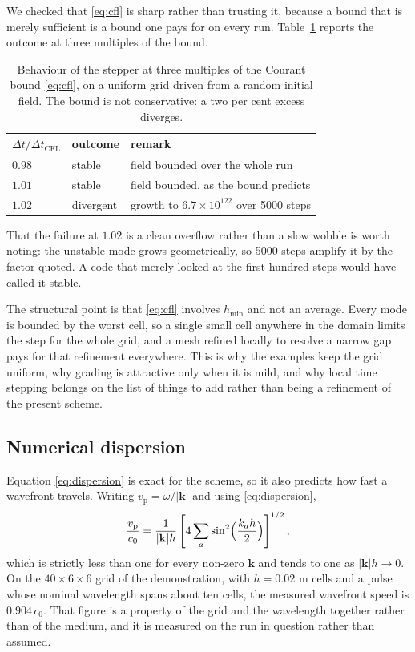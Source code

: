 We checked that \eqref{eq:cfl} is sharp rather than trusting it, because a bound that is merely sufficient is a
bound one pays for on every run. Table~\ref{tab:cfl} reports the outcome at three multiples of the bound.

\begin{table}[H]
  \centering
  \caption{Behaviour of the stepper at three multiples of the Courant bound \eqref{eq:cfl}, on a uniform grid
  driven from a random initial field. The bound is not conservative: a two per cent excess diverges.}
  \label{tab:cfl}
  \begin{tabular}{@{}lll@{}}
    \toprule
    $\Delta t/\Delta t_{\mathrm{CFL}}$ & outcome & remark \\
    \midrule
    $0.98$ & stable    & field bounded over the whole run \\
    $1.01$ & stable    & field bounded, as the bound predicts \\
    $1.02$ & divergent & growth to $6.7\times10^{122}$ over 5000 steps \\
    \bottomrule
  \end{tabular}
\end{table}

That the failure at $1.02$ is a clean overflow rather than a slow wobble is worth noting: the unstable mode grows
geometrically, so 5000 steps amplify it by the factor quoted. A code that merely looked at the first hundred steps
would have called it stable.

The structural point is that \eqref{eq:cfl} involves $h_{\min}$ and not an average. Every mode is bounded by the
worst cell, so a single small cell anywhere in the domain limits the step for the whole grid, and a mesh refined
locally to resolve a narrow gap pays for that refinement everywhere. This is why the examples keep the grid
uniform, why grading is attractive only when it is mild, and why local time stepping belongs on the list of things
to add rather than being a refinement of the present scheme.

\subsection{Numerical dispersion}
\label{sec:dispersion}

Equation \eqref{eq:dispersion} is exact for the scheme, so it also predicts how fast a wavefront travels. Writing
$v_{\mathrm{p}}=\omega/|\mathbf{k}|$ and using \eqref{eq:dispersion},
\begin{equation}
  \frac{v_{\mathrm{p}}}{c_0} = \frac{1}{|\mathbf{k}|h}
  \left[4\sum_{a}\sin^2\Bigl(\frac{k_a h}{2}\Bigr)\right]^{1/2},
  \label{eq:phase}
\end{equation}
which is strictly less than one for every non-zero $\mathbf{k}$ and tends to one as $|\mathbf{k}|h\to0$. On the
$40\times6\times6$ grid of the demonstration, with $h=0.02$ m cells and a pulse whose nominal wavelength spans
about ten cells, the measured wavefront speed is $0.904\,c_0$. That figure is a property of the grid and the
wavelength together rather than of the medium, and it is measured on the run in question rather than assumed.

